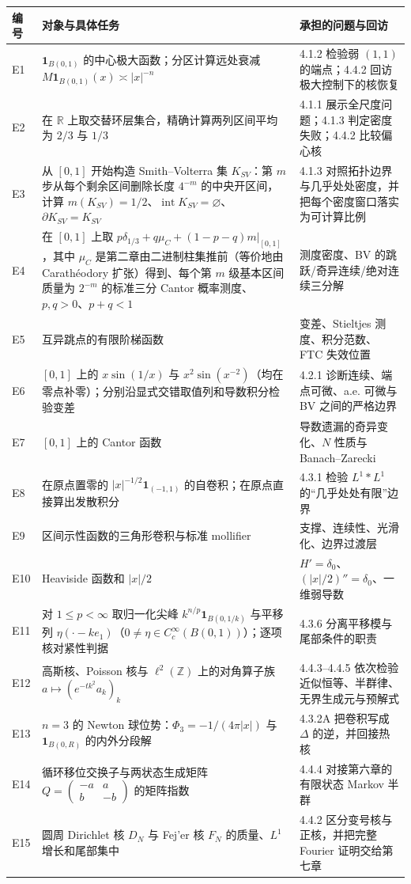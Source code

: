 \documentclass[11pt,a4paper]{ctexart}
\newcommand{\R}{\mathbb R}
\begin{document}
\begin{longtable}{p{}p{}p{}}
\toprule
编号 & 对象与具体任务 & 承担的问题与回访\\
\midrule
E1 & $\mathbf1_{B(0,1)}$ 的中心极大函数；分区计算远处衰减 $M\mathbf1_{B(0,1)}(x)\asymp |x|^{-n}$ & 4.1.2 检验弱 $(1,1)$ 的端点；4.4.2 回访极大控制下的核恢复\\
E2 & 在 $\R$ 上取交替环层集合，精确计算两列区间平均为 $2/3$ 与 $1/3$ & 4.1.1 展示全尺度问题；4.1.3 判定密度失败；4.4.2 比较偏心核\\
E3 & 从 $[0,1]$ 开始构造 Smith--Volterra 集 $K_{SV}$：第 $m$ 步从每个剩余区间删除长度 $4^{-m}$ 的中央开区间，计算 $m(K_{SV})=1/2$、$\operatorname{int}K_{SV}=\varnothing$、$\partial K_{SV}=K_{SV}$ & 4.1.3 对照拓扑边界与几乎处处密度，并把每个密度窗口落实为可计算比例\\
E4 & 在 $[0,1]$ 上取 $p\delta_{1/3}+q\mu_C+(1-p-q)m|_{[0,1]}$，其中 $\mu_C$ 是第二章由二进制柱集推前（等价地由 Carath\'eodory 扩张）得到、每个第 $m$ 级基本区间质量为 $2^{-m}$ 的标准三分 Cantor 概率测度、$p,q>0$、$p+q<1$ & 测度密度、BV 的跳跃/奇异连续/绝对连续三分解\\
E5 & 互异跳点的有限阶梯函数 & 变差、Stieltjes 测度、积分范数、FTC 失效位置\\
E6 & $[0,1]$ 上的 $x\sin(1/x)$ 与 $x^2\sin(x^{-2})$（均在零点补零）；分别沿显式交错取值列和导数积分检验变差 & 4.2.1 诊断连续、端点可微、a.e. 可微与 BV 之间的严格边界\\
E7 & $[0,1]$ 上的 Cantor 函数 & 导数遗漏的奇异变化、$N$ 性质与 Banach--Zarecki\\
E8 & 在原点置零的 $|x|^{-1/2}\mathbf1_{(-1,1)}$ 的自卷积；在原点直接算出发散积分 & 4.3.1 检验 $L^1*L^1$ 的“几乎处处有限”边界\\
E9 & 区间示性函数的三角形卷积与标准 mollifier & 支撑、连续性、光滑化、边界过渡层\\
E10 & Heaviside 函数和 $|x|/2$ & $H'=\delta_0$、$(|x|/2)''=\delta_0$、一维弱导数\\
E11 & 对 $1\le p<\infty$ 取归一化尖峰 $k^{n/p}\mathbf1_{B(0,1/k)}$ 与平移列 $\eta(\cdot-ke_1)$（$0\ne\eta\in C_c^\infty(B(0,1))$）；逐项核对紧性判据 & 4.3.6 分离平移模与尾部条件的职责\\
E12 & 高斯核、Poisson 核与 $\ell^2(\mathbb Z)$ 上的对角算子族 $a\mapsto(e^{-tk^2}a_k)_k$ & 4.4.3--4.4.5 依次检验近似恒等、半群律、无界生成元与预解式\\
E13 & $n=3$ 的 Newton 球位势：$\Phi_3=-1/(4\pi|x|)$ 与 $\mathbf1_{B(0,R)}$ 的内外分段解 & 4.3.2A 把卷积写成 $\Delta$ 的逆，并回接热核\\
E14 & 循环移位交换子与两状态生成矩阵 $Q=\left(\begin{smallmatrix}-a&a\\ b&-b\end{smallmatrix}\right)$ 的矩阵指数 & 4.4.4 对接第六章的有限状态 Markov 半群\\
E15 & 圆周 Dirichlet 核 $D_N$ 与 Fej'er 核 $F_N$ 的质量、$L^1$ 增长和尾部集中 & 4.4.2 区分变号核与正核，并把完整 Fourier 证明交给第七章\\
\bottomrule
\end{longtable}
\end{document}
